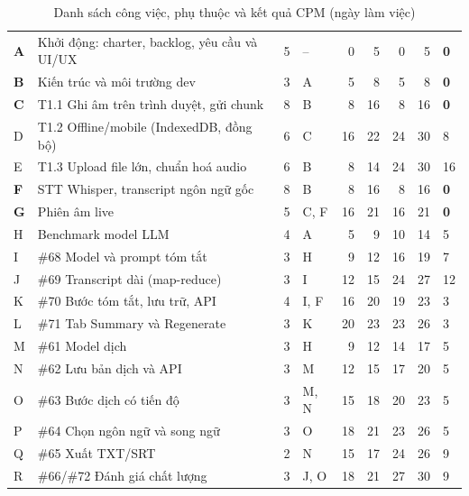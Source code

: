 \documentclass[12pt,a4paper]{report}
\begin{document}
\begin{table}[htbp]
  \centering
  \caption{Danh sách công việc, phụ thuộc và kết quả CPM (ngày làm việc)}
  \label{tab:cpm}
  \small
  \setlength{\tabcolsep}{4pt}
  \begin{tabularx}{\linewidth}{@{}Q{0.6cm}LQ{1.0cm}P{2.1cm}rrrrQ{1.2cm}@{}}
    \toprule
     &  &  &  &  &  & 
      &  &  \\
    \midrule
    \textbf{A} & Khởi động: charter, backlog, yêu cầu và UI/UX & 5 & -- & 0 & 5 & 0 & 5 & \textbf{0} \\
    \textbf{B} & Kiến trúc và môi trường dev & 3 & A & 5 & 8 & 5 & 8 & \textbf{0} \\
    \textbf{C} & T1.1 Ghi âm trên trình duyệt, gửi chunk & 8 & B & 8 & 16 & 8 & 16 & \textbf{0} \\
    D & T1.2 Offline/mobile (IndexedDB, đồng bộ) & 6 & C & 16 & 22 & 24 & 30 & 8 \\
    E & T1.3 Upload file lớn, chuẩn hoá audio & 6 & B & 8 & 14 & 24 & 30 & 16 \\
    \textbf{F} & STT Whisper, transcript ngôn ngữ gốc & 8 & B & 8 & 16 & 8 & 16 & \textbf{0} \\
    \textbf{G} & Phiên âm live & 5 & C, F & 16 & 21 & 16 & 21 & \textbf{0} \\
    H & Benchmark model LLM & 4 & A & 5 & 9 & 10 & 14 & 5 \\
    I & \#68 Model và prompt tóm tắt & 3 & H & 9 & 12 & 16 & 19 & 7 \\
    J & \#69 Transcript dài (map-reduce) & 3 & I & 12 & 15 & 24 & 27 & 12 \\
    K & \#70 Bước tóm tắt, lưu trữ, API & 4 & I, F & 16 & 20 & 19 & 23 & 3 \\
    L & \#71 Tab Summary và Regenerate & 3 & K & 20 & 23 & 23 & 26 & 3 \\
    M & \#61 Model dịch & 3 & H & 9 & 12 & 14 & 17 & 5 \\
    N & \#62 Lưu bản dịch và API & 3 & M & 12 & 15 & 17 & 20 & 5 \\
    O & \#63 Bước dịch có tiến độ & 3 & M, N & 15 & 18 & 20 & 23 & 5 \\
    P & \#64 Chọn ngôn ngữ và song ngữ & 3 & O & 18 & 21 & 23 & 26 & 5 \\
    Q & \#65 Xuất TXT/SRT & 2 & N & 15 & 17 & 24 & 26 & 9 \\
    R & \#66/\#72 Đánh giá chất lượng & 3 & J, O & 18 & 21 & 27 & 30 & 9 \\

\end{tabularx}
\end{table}
\end{document}
